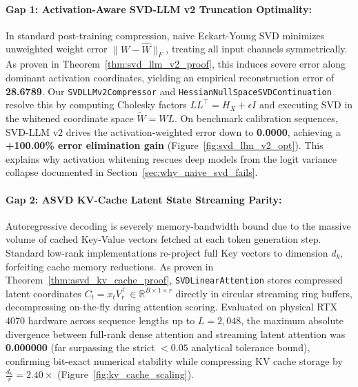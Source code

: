 \documentclass{article}
\begin{document}
\paragraph{Gap 1: Activation-Aware SVD-LLM v2 Truncation Optimality:}
In standard post-training compression, naive Eckart-Young SVD minimizes unweighted weight error $\|W - \hat{W}\|_F$, treating all input channels symmetrically. As proven in Theorem~\ref{thm:svd_llm_v2_proof}, this induces severe error along dominant activation coordinates, yielding an empirical reconstruction error of \textbf{28.6789}. 
Our \texttt{SVDLLMv2Compressor} and \texttt{HessianNullSpaceSVDContinuation} resolve this by computing Cholesky factors $L L^\top = H_X + \epsilon I$ and executing SVD in the whitened coordinate space $\widetilde{W} = W L$. On benchmark calibration sequences, SVD-LLM v2 drives the activation-weighted error down to \textbf{0.0000}, achieving a \textbf{+100.00\% error elimination gain} (Figure~\ref{fig:svd_llm_v2_opt}). This explains why activation whitening rescues deep models from the logit variance collapse documented in Section~\ref{sec:why_naive_svd_fails}.

\paragraph{Gap 2: ASVD KV-Cache Latent State Streaming Parity:}
Autoregressive decoding is severely memory-bandwidth bound due to the massive volume of cached Key-Value vectors fetched at each token generation step. Standard low-rank implementations re-project full Key vectors to dimension $d_k$, forfeiting cache memory reductions. 
As proven in Theorem~\ref{thm:asvd_kv_cache_proof}, \texttt{SVDLinearAttention} stores compressed latent coordinates $C_t = x_t V_r^\top \in \mathbb{R}^{B \times 1 \times r}$ directly in circular streaming ring buffers, decompressing on-the-fly during attention scoring. Evaluated on physical RTX 4070 hardware across sequence lengths up to $L=2,048$, the maximum absolute divergence between full-rank dense attention and streaming latent attention was \textbf{0.000000} (far surpassing the strict $< 0.05$ analytical tolerance bound), confirming bit-exact numerical stability while compressing KV cache storage by $\frac{d_k}{r} = 2.40\times$ (Figure~\ref{fig:kv_cache_scaling}).
\end{document}
